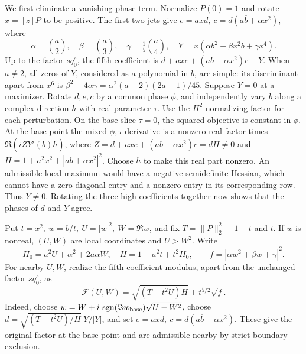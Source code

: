 \documentclass[11pt]{article}
\begin{document}
We first eliminate a vanishing phase term. Normalize \(P(0)=1\)
and rotate \(x=[z]P\) to be positive. The first two jets give
\(e=axd,\ c=d(a\overline b+\alpha x^2)\), where
\[
 \alpha=\binom a2,\quad \beta=\binom a3,\quad
 \gamma=\tfrac15\binom a4,\quad
 Y=x(\alpha b^2+\beta x^2b+\gamma x^4).
\]
Up to the factor \(s q_0^s\), the fifth coefficient is
\(d+axe+(ab+\alpha x^2)c+Y\). When \(a\ne2\), all zeros of
\(Y\), considered as a polynomial in \(b\), are simple: its
discriminant apart from \(x^6\) is
\(\beta^2-4\alpha\gamma=\alpha^2(a-2)(2a-1)/45\).
Suppose \(Y=0\) at a maximizer. Rotate \(d,e,c\) by a common
phase \(\phi\), and independently vary \(b\) along a complex
direction \(h\) with real parameter \(\tau\). Use the \(H^2\)
normalizing factor for each perturbation. On the base slice
\(\tau=0\), the squared objective is constant in \(\phi\).
At the base point the mixed \(\phi,\tau\) derivative is a
nonzero real factor times
\(\Re(iZ\overline{Y'(b)h})\), where
\(Z=d+axe+(ab+\alpha x^2)c=dH\ne0\) and
\(H=1+a^2x^2+|ab+\alpha x^2|^2\).
Choose \(h\) to make this real part nonzero. An admissible
local maximum would have a negative semidefinite Hessian,
which cannot have a zero diagonal entry and a nonzero entry
in its corresponding row. Thus \(Y\ne0\).
Rotating the three high coefficients together now shows that
the phases of \(d\) and \(Y\) agree.

Put \(t=x^2,\ w=b/t,\ U=|w|^2,\ W=\Re w\), and fix
\(T=\|P\|_2^2-1-t\) and \(t\). If \(w\) is nonreal, \((U,W)\)
are local coordinates and \(U>W^2\). Write
\[
 H_0=a^2U+\alpha^2+2a\alpha W,\quad H=1+a^2t+t^2H_0,
 \qquad f=|\alpha w^2+\beta w+\gamma|^2 .
\]
For nearby \(U,W\), realize the fifth-coefficient modulus,
apart from the unchanged factor \(s q_0^s\), as
\begin{equation}\label{eq:fifth-slice-geometry}
 \mathcal F(U,W)=\sqrt{(T-t^2U)H}+t^{5/2}\sqrt f .
\end{equation}
Indeed, choose \(w=W+i\,\operatorname{sgn}(\Im w_{\rm base})
\sqrt{U-W^2}\), choose
\(d=\sqrt{(T-t^2U)/H}\;Y/|Y|\), and set
\(e=axd,\ c=d(a\overline b+\alpha x^2)\).
These give the original factor at the base point and are
admissible nearby by strict boundary exclusion.
\end{document}
